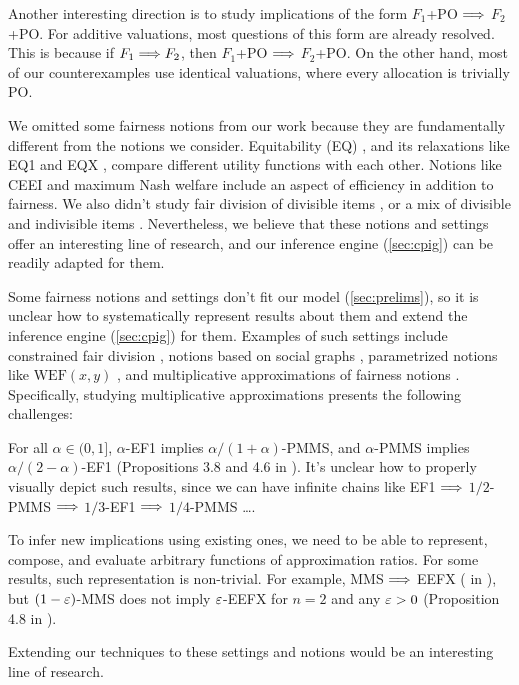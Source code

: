 Another interesting direction is to study implications of the form $F_1$+PO $\Longrightarrow$ $F_2$+PO.
For additive valuations, most questions of this form are already resolved.
This is because if $F_1 \Longrightarrow F_2$, then $F_1$+PO $\Longrightarrow$ $F_2$+PO.
On the other hand, most of our counterexamples use identical valuations,
where every allocation is trivially PO.

We omitted some fairness notions from our work because
they are fundamentally different from the notions we consider.
Equitability (EQ) \citep{brams1996fair}, and its relaxations like EQ1 and EQX
\citep{amanatidis2023fair,gourves2014near}, compare different utility functions with each other.
Notions like CEEI \citep{varian1974equity} and maximum Nash welfare \citep{caragiannis2019unreasonable}
include an aspect of efficiency in addition to fairness.
We also didn't study fair division of divisible items \citep{steinhaus1940sur,stromquist1980how,varian1974equity},
or a mix of divisible and indivisible items \citep{liu2024mixed}.
Nevertheless, we believe that these notions and settings offer an interesting line of research,
and our inference engine (\cref{sec:cpig}) can be readily adapted for them.

Some fairness notions and settings don't fit our model (\cref{sec:prelims}),
so it is unclear how to systematically represent results about them
and extend the inference engine (\cref{sec:cpig}) for them.
Examples of such settings include constrained fair division
\citep{gourves2014near,bouveret2017fair,biswas2018fair,equbal2024fair},
notions based on social graphs \citep{aziz2018knowledge},
parametrized notions like $\mathrm{WEF}(x, y)$ \citep{chakraborty2024weighted},
and multiplicative approximations of fairness notions \citep{amanatidis2018comparing}.
Specifically, studying multiplicative approximations presents the following challenges:
\begin{tightenum}
\item For all $\alpha \in (0,1]$, $\alpha$-EF1 implies $\alpha/(1+\alpha)$-PMMS,
    and $\alpha$-PMMS implies $\alpha/(2-\alpha)$-EF1
    (Propositions 3.8 and 4.6 in \citet{amanatidis2018comparing}).
    It's unclear how to properly visually depict such results, since we can have
    infinite chains like EF1 $\Longrightarrow$ $1/2$-PMMS $\Longrightarrow$ $1/3$-EF1 $\Longrightarrow$ $1/4$-PMMS \ldots.
\item To infer new implications using existing ones, we need to be able to
    represent, compose, and evaluate arbitrary functions of approximation ratios.
    For some results, such representation is non-trivial.
    For example, MMS $\Longrightarrow$ EEFX ( in ),
    but $(1-\varepsilon)$-MMS does not imply $\varepsilon$-EEFX for $n=2$ and any $\varepsilon > 0$
    (Proposition 4.8 in \citet{amanatidis2018comparing}).
\end{tightenum}
Extending our techniques to these settings and notions would be an interesting line of research.
